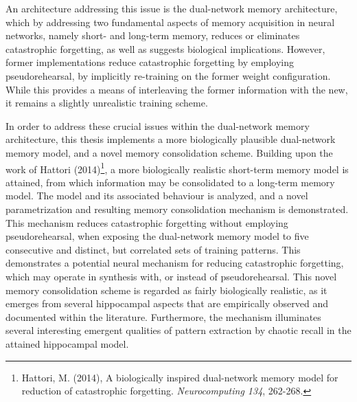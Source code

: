 An architecture addressing this issue is the dual-network memory architecture, which by addressing two fundamental aspects of memory acquisition in neural networks, namely short- and long-term memory, reduces or eliminates catastrophic forgetting, as well as suggests biological implications. However, former implementations reduce catastrophic forgetting by employing pseudorehearsal, by implicitly re-training on the former weight configuration. While this provides a means of interleaving the former information with the new, it remains a slightly unrealistic training scheme.

In order to address these crucial issues within the dual-network memory architecture, this thesis implements a more biologically plausible dual-network memory model, and a novel memory consolidation scheme.
Building upon the work of Hattori (2014)\footnote{Hattori, M. (2014), A biologically inspired dual-network memory model for reduction of catastrophic forgetting. \textit{Neurocomputing 134}, 262-268.}, a more biologically realistic short-term memory model is attained, from which information may be consolidated to a long-term memory model. The model and its associated behaviour is analyzed, and a novel parametrization and resulting memory consolidation mechanism is demonstrated. This mechanism reduces catastrophic forgetting without employing pseudorehearsal, when exposing the dual-network memory model to five consecutive and distinct, but correlated sets of training patterns. This demonstrates a potential neural mechanism for reducing catastrophic forgetting, which may operate in synthesis with, or instead of pseudorehearsal. This novel memory consolidation scheme is regarded as fairly biologically realistic, as it emerges from several hippocampal aspects that are empirically observed and documented within the literature. Furthermore, the mechanism illuminates several interesting emergent qualities of pattern extraction by chaotic recall in the attained hippocampal model.

\clearpage